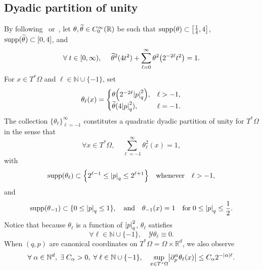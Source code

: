 \documentclass[AHL,Unicode,longabstracts]{cedram}
\newcommand{\R}{\mathbb{R}}
\newcommand{\N}{\mathbb{N}}
\newcommand{\clY}{\mathcal{Y}}
\newcommand{\p}{\partial}
\DeclareMathOperator{\suppp}{supp}
\newcommand{\abs}[1]{\left| #1 \right|}
\newcommand{\supp}[1]{\suppp\left({#1}\right)}
\let\oldtilde\tilde
\renewcommand*{\tilde}[1]{\mathchoice{\widetilde{#1}}{\widetilde{#1}}{\oldtilde{#1}}{\oldtilde{#1}}}
\let\oldexists\exists
\renewcommand*{\exists}{\mathrel{\oldexists}}
\let\oldforall\forall
\renewcommand*{\forall}{\mathrel{\oldforall}}
\let\originalleft\left
\let\originalright\right
\renewcommand{\left}{\mathopen{}\mathclose\bgroup\originalleft}
\renewcommand{\right}{\aftergroup\egroup\originalright}
\begin{document}
\subsection{Dyadic partition of unity}\label{subSec:DyadicPartitionOfUnity}
By following~\cite{Leb1,Leb2} or~\cite{BCD}, let $\theta, \tilde{\theta} \in C^\infty_0(\R)$ be such that $\supp{\theta} \subset \left[\frac{1}{4}, 4 \right]$, $\suppp(\tilde{\theta}) \subset
[0,4]$, and
\begin{equation}\label{eq:dyadic}
\forall t\in [0,\infty), \phantom{ccc} \tilde{\theta}^{2}(4t^{2}) + \sum_{\ell=0}^{\infty} \theta^{2} \left(2^{-2 \ell} t^2 \right) = 1.
\end{equation}
For $x \in T^*\Omega$ and $\ell \in \N \cup \{-1\}$, set
\begin{equation}
\theta_\ell(x) =
\begin{cases}
\theta \left(2^{-2 \ell} \abs{p}^2_q\right),  &\ell > -1, \\
\tilde{\theta}(4 \abs{p}^2_q),  &\ell = -1.
\end{cases}
\end{equation}
The collection $\{\theta_\ell\}_{\ell = -1}^\infty$ constitutes a quadratic dyadic partition of unity for $T^*\Omega$ in the sense that
\begin{equation}
\forall x \in T^*\Omega,\quad \sum_{\ell = -1}^\infty \theta^2_\ell(x) = 1,
\end{equation}
with
\begin{equation}
\supp{\theta_\ell} \subset \left\{2^{\ell-1} \le \abs{p}_q \le 2^{\ell+1}\right\} \quad  \text{whenever} \quad \ell>-1,
\end{equation}
and
\begin{equation}
\supp{\theta_{-1}} \subset \{0 \le \abs{p}_q \le 1\}, \quad \text{and} \quad \theta_{-1}(x) = 1 \quad \text{for} \; 0 \le \abs{p}_q \le \frac{1}{2}.
\end{equation}
Notice that because $\theta_{\ell}$ is a function of $\abs{p}^2_q$, $\theta_{\ell}$ satisfies
\begin{equation}\label{Y_kills_theta_ell}
\forall \ell \in \N \cup \{-1\}, \quad \clY \theta_\ell \equiv 0.
\end{equation}
When $(q,p)$ are canonical coordinates on $T^* \Omega=\Omega\times\R^d$, we also observe
\begin{equation}\label{p_derivative_estimates_thetas}
\forall \alpha\in \N^d, \; \exists C_{\alpha}>0, \; \forall \ell \in \N \cup \{-1\}, \quad \sup_{x\in T^* \Omega} \left|\p_{p}^{\alpha}\theta_{\ell}(x)\right| \leq C_{\alpha} 2^{-|\alpha|\ell}.
\end{equation}
\end{document}
